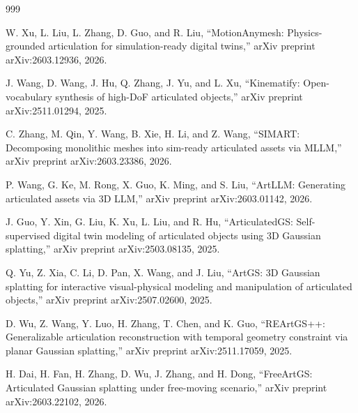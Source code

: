 \documentclass[12pt,a4paper,oneside]{report}
\begin{document}
\begin{thebibliography}{999}

W. Xu, L. Liu, L. Zhang, D. Guo, and R. Liu, ``{MotionAnymesh}: Physics-grounded articulation for simulation-ready digital twins,'' arXiv preprint arXiv:2603.12936, 2026.




J. Wang, D. Wang, J. Hu, Q. Zhang, J. Yu, and L. Xu, ``Kinematify: Open-vocabulary synthesis of high-{DoF} articulated objects,'' arXiv preprint arXiv:2511.01294, 2025.




C. Zhang, M. Qin, Y. Wang, B. Xie, H. Li, and Z. Wang, ``{SIMART}: Decomposing monolithic meshes into sim-ready articulated assets via {MLLM},'' arXiv preprint arXiv:2603.23386, 2026.




P. Wang, G. Ke, M. Rong, X. Guo, K. Ming, and S. Liu, ``ArtLLM: Generating articulated assets via {3D} LLM,'' arXiv preprint arXiv:2603.01142, 2026.




J. Guo, Y. Xin, G. Liu, K. Xu, L. Liu, and R. Hu, ``{ArticulatedGS}: Self-supervised digital twin modeling of articulated objects using {3D} Gaussian splatting,'' arXiv preprint arXiv:2503.08135, 2025.




Q. Yu, Z. Xia, C. Li, D. Pan, X. Wang, and J. Liu, ``{ArtGS}: {3D} Gaussian splatting for interactive visual-physical modeling and manipulation of articulated objects,'' arXiv preprint arXiv:2507.02600, 2025.




D. Wu, Z. Wang, Y. Luo, H. Zhang, T. Chen, and K. Guo, ``{REArtGS++}: Generalizable articulation reconstruction with temporal geometry constraint via planar Gaussian splatting,'' arXiv preprint arXiv:2511.17059, 2025.




H. Dai, H. Fan, H. Zhang, D. Wu, J. Zhang, and H. Dong, ``{FreeArtGS}: Articulated Gaussian splatting under free-moving scenario,'' arXiv preprint arXiv:2603.22102, 2026.




\end{thebibliography}
\end{document}
